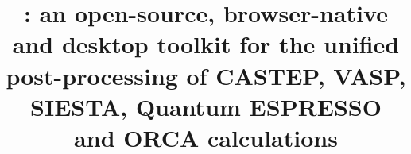\title{\BMR{}: an open-source, browser-native and desktop toolkit for the unified post-processing of CASTEP, VASP, SIESTA, Quantum ESPRESSO and ORCA calculations}
